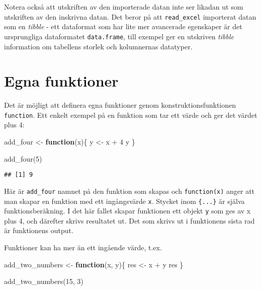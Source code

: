 \documentclass[
]{book}
\newenvironment{Shaded}{\begin{snugshade}}{\end{snugshade}}
\newcommand{\ControlFlowTok}[1]{\textcolor[rgb]{0.13,0.29,0.53}{\textbf{#1}}}
\newcommand{\DecValTok}[1]{\textcolor[rgb]{0.00,0.00,0.81}{#1}}
\newcommand{\FunctionTok}[1]{\textcolor[rgb]{0.00,0.00,0.00}{#1}}
\newcommand{\NormalTok}[1]{#1}
\newcommand{\OtherTok}[1]{\textcolor[rgb]{0.56,0.35,0.01}{#1}}
\newcommand{\SpecialCharTok}[1]{\textcolor[rgb]{0.00,0.00,0.00}{#1}}
\theoremstyle{definition}
\theoremstyle{definition}
\theoremstyle{definition}
\theoremstyle{definition}
\theoremstyle{remark}
\begin{document}
Notera också att utskriften av den importerade datan inte ser likadan ut som utskriften av den inskrivna datan. Det beror på att \texttt{read\_excel} importerat datan som en \emph{tibble} - ett dataformat som har lite mer avancerade egenskaper är det ursprungliga dataformatet \texttt{data.frame}, till exempel ger en utskriven \emph{tibble} information om tabellens storlek och kolumnernas datatyper.

\hypertarget{egna-funktioner}{%
\section{Egna funktioner}\label{egna-funktioner}}

Det är möjligt att definera egna funktioner genom konstruktionsfunktionen \texttt{function}. Ett enkelt exempel på en funktion som tar ett värde och ger det värdet plus 4:

\begin{Shaded}
\begin{Highlighting}[]
\NormalTok{add\_four }\OtherTok{\textless{}{-}} \ControlFlowTok{function}\NormalTok{(x)\{}
\NormalTok{  y }\OtherTok{\textless{}{-}}\NormalTok{ x }\SpecialCharTok{+} \DecValTok{4}
\NormalTok{  y}
\NormalTok{\}}

\FunctionTok{add\_four}\NormalTok{(}\DecValTok{5}\NormalTok{)}
\end{Highlighting}
\end{Shaded}

\begin{verbatim}
## [1] 9
\end{verbatim}

Här är \texttt{add\_four} namnet på den funktion som skapas och \texttt{function(x)} anger att man skapar en funktion med ett ingångsvärde \texttt{x}. Stycket inom \texttt{\{...\}} är själva funktionsberäkning. I det här fallet skapar funktionen ett objekt \texttt{y} som ges av x plus 4, och därefter skrivs resultatet ut. Det som skrivs ut i funktionens sista rad är funktionens output.

Funktioner kan ha mer än ett ingående värde, t.ex.

\begin{Shaded}
\begin{Highlighting}[]
\NormalTok{add\_two\_numbers }\OtherTok{\textless{}{-}} \ControlFlowTok{function}\NormalTok{(x, y)\{}
\NormalTok{  res }\OtherTok{\textless{}{-}}\NormalTok{ x }\SpecialCharTok{+}\NormalTok{ y}
\NormalTok{  res}
\NormalTok{\}}

\FunctionTok{add\_two\_numbers}\NormalTok{(}\DecValTok{15}\NormalTok{, }\DecValTok{3}\NormalTok{)}
\end{Highlighting}
\end{Shaded}
\end{document}
